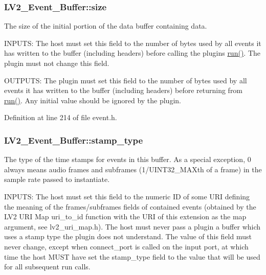\subsubsection[{\texorpdfstring{size}{size}}]{ L\+V2\+\_\+\+Event\+\_\+\+Buffer\+::size}\hypertarget{struct_l_v2___event___buffer_ac3d68812737a6e7ccd5218209fd1e420}{}\label{struct_l_v2___event___buffer_ac3d68812737a6e7ccd5218209fd1e420}
The size of the initial portion of the data buffer containing data.

I\+N\+P\+U\+TS\+: The host must set this field to the number of bytes used by all events it has written to the buffer (including headers) before calling the plugin\textquotesingle{}s \hyperlink{namespacewaflib_1_1_task_a859c6336afe027ae782f84b9e49a4f0f}{run()}. The plugin must not change this field.

O\+U\+T\+P\+U\+TS\+: The plugin must set this field to the number of bytes used by all events it has written to the buffer (including headers) before returning from \hyperlink{namespacewaflib_1_1_task_a859c6336afe027ae782f84b9e49a4f0f}{run()}. Any initial value should be ignored by the plugin. 

Definition at line 214 of file event.\+h.

\subsubsection[{\texorpdfstring{stamp\+\_\+type}{stamp_type}}]{ L\+V2\+\_\+\+Event\+\_\+\+Buffer\+::stamp\+\_\+type}\hypertarget{struct_l_v2___event___buffer_a1ae050b6afc0511b9bf8af655ae295e1}{}\label{struct_l_v2___event___buffer_a1ae050b6afc0511b9bf8af655ae295e1}
The type of the time stamps for events in this buffer. As a special exception, \textquotesingle{}0\textquotesingle{} always means audio frames and subframes (1/\+U\+I\+N\+T32\+\_\+\+M\+AX\textquotesingle{}th of a frame) in the sample rate passed to instantiate.

I\+N\+P\+U\+TS\+: The host must set this field to the numeric ID of some U\+RI defining the meaning of the frames/subframes fields of contained events (obtained by the L\+V2 U\+RI Map uri\+\_\+to\+\_\+id function with the U\+RI of this extension as the \textquotesingle{}map\textquotesingle{} argument, see lv2\+\_\+uri\+\_\+map.\+h). The host must never pass a plugin a buffer which uses a stamp type the plugin does not \textquotesingle{}understand\textquotesingle{}. The value of this field must never change, except when connect\+\_\+port is called on the input port, at which time the host M\+U\+ST have set the stamp\+\_\+type field to the value that will be used for all subsequent run calls.

